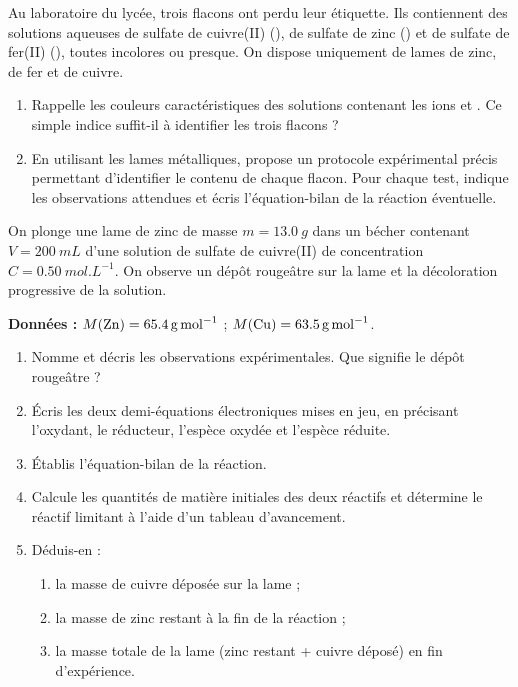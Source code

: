 \documentclass[11pt]{article}
\newcounter{popsec}
\newcounter{popsub}
\newcommand{\courssub}[1]{%
  \stepcounter{popsub}%
  \par\vspace{9pt}\noindent{\popxbold\fontsize{11.5}{13}\selectfont\color{popink}{\color{poporange}\thepopsec.\thepopsub}\hspace{6pt}#1}\par\nopagebreak\vspace{4pt}
}
\begin{document}
\begin{exercice}
Au laboratoire du lycée, trois flacons ont perdu leur étiquette. Ils contiennent des solutions aqueuses de sulfate de cuivre(II) (), de sulfate de zinc () et de sulfate de fer(II) (), toutes incolores ou presque. On dispose uniquement de lames de zinc, de fer et de cuivre.
\begin{enumerate}
\item Rappelle les couleurs caractéristiques des solutions contenant les ions  et . Ce simple indice suffit-il à identifier les trois flacons ?
\item En utilisant les lames métalliques, propose un protocole expérimental précis permettant d'identifier le contenu de chaque flacon. Pour chaque test, indique les observations attendues et écris l'équation-bilan de la réaction éventuelle.
\end{enumerate}
\end{exercice}

\courssub{Je me prépare au Probatoire}

\begin{exercice}
On plonge une lame de zinc de masse $m = \SI{13,0}{g}$ dans un bécher contenant $V = \SI{200}{mL}$ d'une solution de sulfate de cuivre(II) de concentration $C = \SI{0,50}{mol.L^{-1}}$. On observe un dépôt rougeâtre sur la lame et la décoloration progressive de la solution.

\textbf{Données :} $M(\ce{Zn}) = \SI{65,4}{g.mol^{-1}}$ ; $M(\ce{Cu}) = \SI{63,5}{g.mol^{-1}}$.

\begin{enumerate}
\item Nomme et décris les observations expérimentales. Que signifie le dépôt rougeâtre ?
\item Écris les deux demi-équations électroniques mises en jeu, en précisant l'oxydant, le réducteur, l'espèce oxydée et l'espèce réduite.
\item Établis l'équation-bilan de la réaction.
\item Calcule les quantités de matière initiales des deux réactifs et détermine le réactif limitant à l'aide d'un tableau d'avancement.
\item Déduis-en :
\begin{enumerate}
\item la masse de cuivre déposée sur la lame ;
\item la masse de zinc restant à la fin de la réaction ;
\item la masse totale de la lame (zinc restant + cuivre déposé) en fin d'expérience.
\end{enumerate}
\end{enumerate}
\end{exercice}
\end{document}
